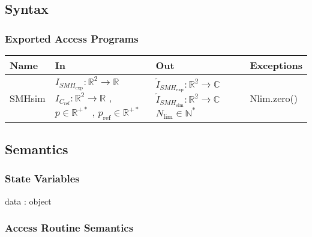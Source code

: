 \documentclass[12pt, titlepage]{article}
\begin{document}
\subsection{Syntax}

\subsubsection{Exported Access Programs}

\begin{center}
\begin{tabular}{p{2cm} p{4cm} p{4cm} p{2cm}}
\hline
\textbf{Name} & \textbf{In} & \textbf{Out} & \textbf{Exceptions} \\
\hline
SMHsim & $I_{\mathit{SMH}_{\text{exp}}}:\mathbb{R}^2\rightarrow\mathbb{R} $ $ I_{C_{\text{ref}}}:\mathbb{R}^2\rightarrow\mathbb{R}$ , $p \in \mathbb{R}^{+*}$ , $p_{\text{ref}} \in \mathbb{R}^{+*}$ & $\widetilde{I}_{\mathit{SMH}_{\text{exp}}}:\mathbb{R}^2\rightarrow\mathbb{C}$ $\widetilde{I}_{\mathit{SMH}_{\text{sim}}}:\mathbb{R}^2\rightarrow\mathbb{C}$ $N_{\text{lim}} \in \mathbb{N}^{*}$ & Nlim.zero() \\
\hline
\end{tabular}
\end{center}

\subsection{Semantics}

\subsubsection{State Variables}

data : object

\subsubsection{Access Routine Semantics}
\end{document}
